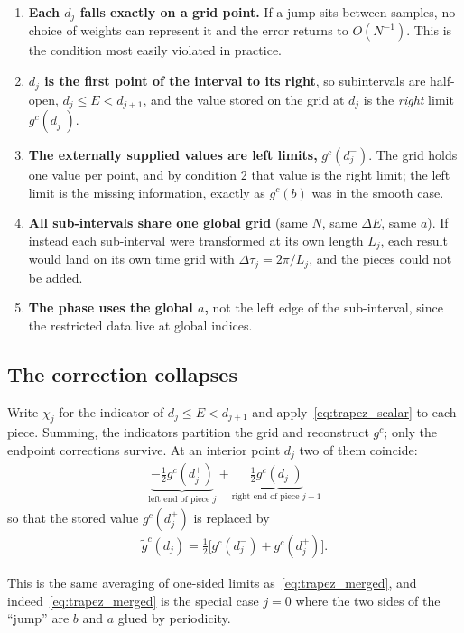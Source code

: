 \documentclass{article}
\begin{document}
	\begin{enumerate}
		\item \textbf{Each $d_j$ falls exactly on a grid point.} If a jump sits
		between samples, no choice of weights can represent it and the error
		returns to $O(N^{-1})$. This is the condition most easily violated in
		practice.
		\item \textbf{$d_j$ is the first point of the interval to its right}, so
		subintervals are half-open, $d_j\le E<d_{j+1}$, and the value stored on
		the grid at $d_j$ is the \emph{right} limit $g^c(d_j^+)$.
		\item \textbf{The externally supplied values are left limits,}
		$g^c(d_j^-)$. The grid holds one value per point, and by condition 2
		that value is the right limit; the left limit is the missing
		information, exactly as $g^c(b)$ was in the smooth case.
		\item \textbf{All sub-intervals share one global grid} (same $N$, same
		$\Delta E$, same $a$). If instead each sub-interval were transformed at
		its own length $L_j$, each result would land on its own time grid with
		$\Delta\tau_j = 2\pi/L_j$, and the pieces could not be added.
		\item \textbf{The phase uses the global $a$,} not the left edge of the
		sub-interval, since the restricted data live at global indices.
	\end{enumerate}
	
	\subsection{The correction collapses}
	
	Write $\chi_j$ for the indicator of $d_j\le E<d_{j+1}$ and apply~\eqref{eq:trapez_scalar}
	to each piece. Summing, the indicators partition the grid and reconstruct $g^c$; only the endpoint corrections survive. At an
	interior point $d_j$ two of them coincide:
	\begin{align}
		\underbrace{-\tfrac12 g^c(d_j^+)}_{\text{left end of piece } j}
		+ \underbrace{\tfrac12 g^c(d_j^-)}_{\text{right end of piece } j-1}
	\end{align}
	so that the stored value $g^c(d_j^+)$ is replaced by
	\begin{align}
		\boxed{\;\tilde{g}^c(d_j) = \tfrac12\big[g^c(d_j^-) + g^c(d_j^+)\big].\;}
		\label{eq:disc}
	\end{align}
	
	This is the same averaging of one-sided limits as~\eqref{eq:trapez_merged}, and
	indeed~\eqref{eq:trapez_merged} is the special case $j=0$ where the two sides of
	the ``jump'' are $b$ and $a$ glued by periodicity.
	
\end{document}

